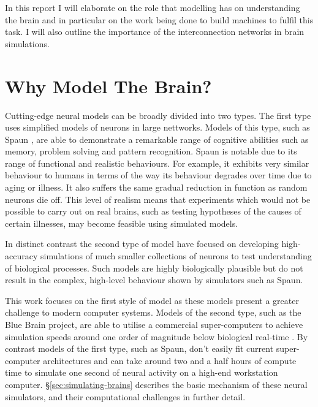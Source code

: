 	In this report I will elaborate on the role that modelling has on
	understanding the brain and in particular on the work being done to build
	machines to fulfil this task. I will also outline the importance of the
	interconnection networks in brain simulations.
	
	\section{Why Model The Brain?}
	
		
		
		Cutting-edge neural models can be broadly divided into two types. The first
		type uses simplified models of neurons in large nettworks. Models of this
		type, such as Spaun \cite{eliasmith12}, are able to demonstrate a remarkable
		range of cognitive abilities such as memory, problem solving and pattern
		recognition. Spaun is notable due to its range of functional and realistic
		behaviours. For example, it exhibits very similar behaviour to humans in
		terms of the way its behaviour degrades over time due to aging or illness.
		It also suffers the same gradual reduction in function as random neurons die
		off. This level of realism means that experiments which would not be
		possible to carry out on real brains, such as testing hypotheses of the
		causes of certain illnesses, may become feasible using simulated models.
		
		In distinct contrast the second type of model have focused on developing
		high-accuracy simulations of much smaller collections of neurons to test
		understanding of biological processes. Such models are highly biologically
		plausible but do not result in the complex, high-level behaviour shown by
		simulators such as Spaun.
		
		This work focuses on the first style of model as these models present a
		greater challenge to modern computer systems. Models of the second type,
		such as the Blue Brain project, are able to utilise a commercial
		super-computers to achieve simulation speeds around one order of magnitude
		below biological real-time \cite{markram06}. By contrast models of the first
		type, such as Spaun, don't easily fit current super-computer architectures
		and can take around two and a half hours of compute time to simulate one
		second of neural activity on a high-end workstation computer.
		\S\ref{sec:simulating-brains} describes the basic mechanism of these neural
		simulators, and their computational challenges in further detail.
	
